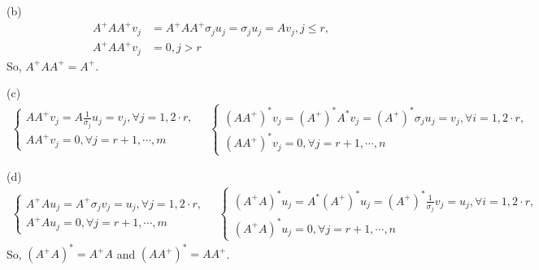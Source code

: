 \documentclass[a4paper]{article}
\begin{document}
\noindent (b) 
\begin{align*}
  A^{+}AA^{+}v_j & = A^{+}AA^{+}\sigma_ju_j = \sigma_ju_j = Av_j,j\leqslant r, \\
  A^{+}AA^{+}v_j & = 0, j > r
\end{align*} 
So, $A^{+}AA^{+} = A^{+}$.

\noindent (c)
\begin{align*}
  \left\{
  \begin{array}{l}
  AA^{+}v_j = A\frac{1}{\sigma_j}u_j = v_j, \forall j = 1, 2 \cdot r,\\
  AA^{+}v_j = 0, \forall j = r+1, \cdots, m
  \end{array}
  \right.
  \quad
  \left\{
  \begin{array}{l}
    (AA^{+})^*v_j = (A^+)^*A^*v_j = (A^+)^*\sigma_j u_j = v_j, \forall i = 1, 2 \cdot r,\\
    (AA^{+})^*v_j = 0, \forall j = r+1, \cdots, n
  \end{array}
  \right.
\end{align*}

\noindent (d)
\begin{align*}
  \left\{
  \begin{array}{l}
  A^{+}Au_j = A^{+}\sigma_jv_j = u_j, \forall j = 1, 2 \cdot r,\\
  A^{+}Au_j = 0, \forall j = r+1, \cdots, m
  \end{array}
  \right.
  \quad
  \left\{
  \begin{array}{l}
    (A^{+}A)^*u_j = A^*(A^+)^*u_j = (A^+)^*\frac{1}{\sigma_j} v_j = u_j, \forall i = 1, 2 \cdot r,\\
    (A^{+}A)^*u_j = 0, \forall j = r+1, \cdots, n
  \end{array}
  \right.
\end{align*}
So, $(A^{+}A)^* = A^{+}A$ and $(AA^{+})^* = AA^{+}$.
\end{document}
